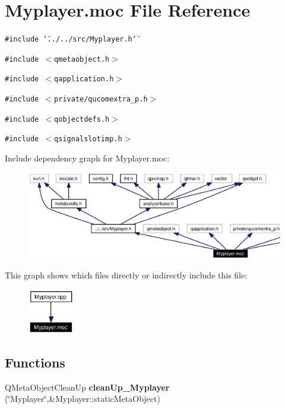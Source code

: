 \section{Myplayer.moc File Reference}
\label{Myplayer_8moc}


{\tt \#include \char`\"{}../../src/Myplayer.h\char`\"{}}\par
{\tt \#include $<$qmetaobject.h$>$}\par
{\tt \#include $<$qapplication.h$>$}\par
{\tt \#include $<$private/qucomextra\_\-p.h$>$}\par
{\tt \#include $<$qobjectdefs.h$>$}\par
{\tt \#include $<$qsignalslotimp.h$>$}\par


Include dependency graph for Myplayer.moc:\begin{figure}[H]
\begin{center}
\leavevmode
\includegraphics[width=402pt]{Myplayer_8moc__incl}
\end{center}
\end{figure}


This graph shows which files directly or indirectly include this file:\begin{figure}[H]
\begin{center}
\leavevmode
\includegraphics[width=57pt]{Myplayer_8moc__dep__incl}
\end{center}
\end{figure}
\subsection*{Functions}
\begin{CompactItemize}
\item 
QMeta\-Object\-Clean\-Up {\bf clean\-Up\_\-Myplayer} (\char`\"{}Myplayer\char`\"{},\&Myplayer::static\-Meta\-Object)
\end{CompactItemize}



